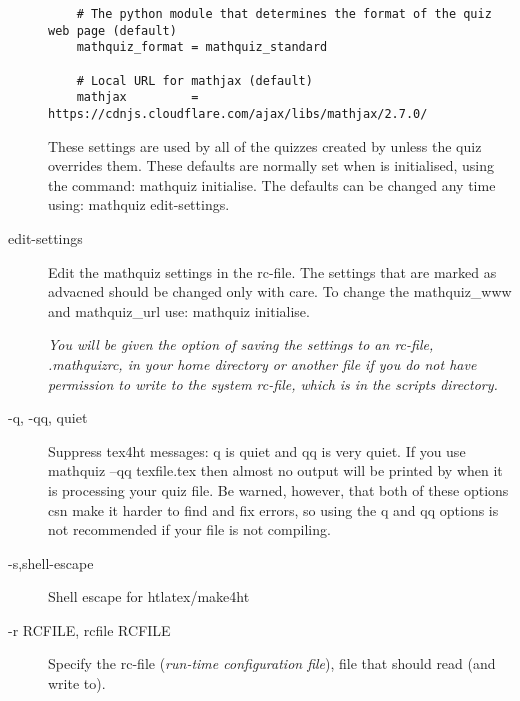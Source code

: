 \documentclass[svgnames]{article}
\newcommand\ddash{\texttt{\textemdash\textemdash}}
\newcommand\mathquizopt[1]{\textsf{mathquiz \ddash#1}}
\begin{document}
\begin{description}
\begin{verbatim}
    # The python module that determines the format of the quiz web page (default)
    mathquiz_format = mathquiz_standard

    # Local URL for mathjax (default)
    mathjax         = https://cdnjs.cloudflare.com/ajax/libs/mathjax/2.7.0/
          \end{verbatim}

          These settings are used by all of the quizzes created by
          \MathQuiz unless the quiz overrides them. These defaults are
          normally set when \MathQuiz is initialised, using the command:
          \mathquizopt{initialise}. The defaults can be changed any time using:
          \mathquizopt{edit-settings}.

       \item[\ddash edit-settings] 
          Edit the mathquiz settings in the rc-file. The settings that
          are marked as advacned should be changed only with care. To
          change the \textsf{mathquiz\_www} and \textsf{mathquiz\_url}
          use: \mathquizopt{initialise}.

          \textit{You will be given the option of saving the \MathQuiz settings to an rc-file,
          \textsf{.mathquizrc}, in your home directory or another file if you do
          not have permission to write to the system rc-file, which is in the
          \MathQuiz scripts directory. }

       \item[-q, -qq, \ddash quiet] 
       Suppress tex4ht messages: \textsf{\ddash q} is quiet and \textsf{\ddash qq} is  very quiet. If you use
       \textsf{mathquiz --qq texfile.tex} then almost no output will
       be printed by \MathQuiz when it is processing your quiz file. Be
       warned, however, that both of these options csn make it harder to find and fix
       errors, so using the \textsf{\ddash q} and \textsf{\ddash qq} options is not
       recommended if your file is not compiling.

       \item[-s,\ddash shell-escape] 
          Shell escape for htlatex/make4ht

       \item[-r RCFILE, \ddash rcfile RCFILE]
          Specify the rc-file (\textit{run-time configuration file}), file
          that \MathQuiz should read (and write to).


\end{description}
\end{document}
